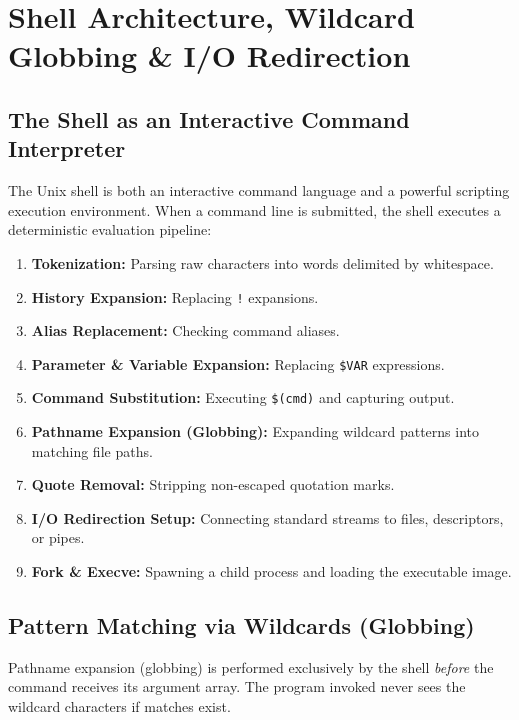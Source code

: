 \chapter{Shell Architecture, Wildcard Globbing \& I/O Redirection}
\label{chap:shell-features}

\section{The Shell as an Interactive Command Interpreter}
The Unix shell is both an interactive command language and a powerful scripting execution environment. When a command line is submitted, the shell executes a deterministic evaluation pipeline:
\begin{enumerate}[leftmargin=1.5em]
    \item \textbf{Tokenization:} Parsing raw characters into words delimited by whitespace.
    \item \textbf{History Expansion:} Replacing \texttt{!} expansions.
    \item \textbf{Alias Replacement:} Checking command aliases.
    \item \textbf{Parameter \& Variable Expansion:} Replacing \texttt{\$VAR} expressions.
    \item \textbf{Command Substitution:} Executing \texttt{\$(cmd)} and capturing output.
    \item \textbf{Pathname Expansion (Globbing):} Expanding wildcard patterns into matching file paths.
    \item \textbf{Quote Removal:} Stripping non-escaped quotation marks.
    \item \textbf{I/O Redirection Setup:} Connecting standard streams to files, descriptors, or pipes.
    \item \textbf{Fork \& Execve:} Spawning a child process and loading the executable image.
\end{enumerate}

\section{Pattern Matching via Wildcards (Globbing)}
Pathname expansion (globbing) is performed exclusively by the shell \textit{before} the command receives its argument array. The program invoked never sees the wildcard characters if matches exist.


